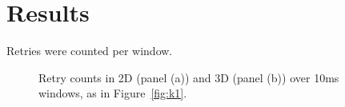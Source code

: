 \section{Results}
Retries were counted per window.
\begin{figure}
\caption{Retry counts in 2D (panel (a)) and 3D (panel (b)) over 10ms windows, as in Figure~\ref{fig:k1}.}
\end{figure}
